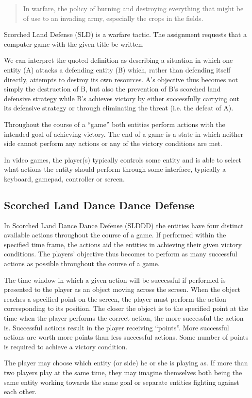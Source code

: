 \begin{quote}
	In warfare, the policy of burning and destroying everything that might be of use to an invading army, especially the crops in the fields.\cite{lab-compendium}
\end{quote}
Scorched Land Defense (SLD) is a warfare tactic. The assignment requests that a computer game with the given title be written.

We can interpret the quoted definition as describing a situation in which one entity (A) attacks a defending entity (B) which, rather than defending itself directly, attempts to destroy its own resources.
A's objective thus becomes not simply the destruction of B, but also the prevention of B's scorched land defensive strategy while B's achieves victory by either successfully carrying out its defensive strategy or through eliminating the threat (i.e. the defeat of A).

Throughout the course of a ``game'' both entities perform actions with the intended goal of achieving victory.
The end of a game is a state in which neither side cannot perform any actions or any of the victory conditions are met.

In video games, the player(s) typically controls some entity and is able to select what actions the entity should perform through some interface, typically a keyboard, gamepad, controller or screen.

\subsection{Scorched Land Dance Dance Defense}
In Scorched Land Dance Dance Defense (SLDDD) the entities have four distinct available actions throughout the course of a game.
If performed within the specified time frame, the actions aid the entities in achieving their given victory conditions.
The players' objective thus becomes to perform as many successful actions as possible throughout the course of a game.

The time window in which a given action will be successful if performed is presented to the player as an object moving across the screen.
When the object reaches a specified point on the screen, the player must perform the action corresponding to its position.
The closer the object is to the specified point at the time when the player performs the correct action, the more successful the action is.
Successful actions result in the player receiving ``points''.
More successful actions are worth more points than less successful actions.
Some number of points is required to achieve a victory condition.

The player may choose which entity (or side) he or she is playing as.
If more than two players play at the same time, they may imagine themselves both being the same entity working towards the same goal or separate entities fighting against each other.

